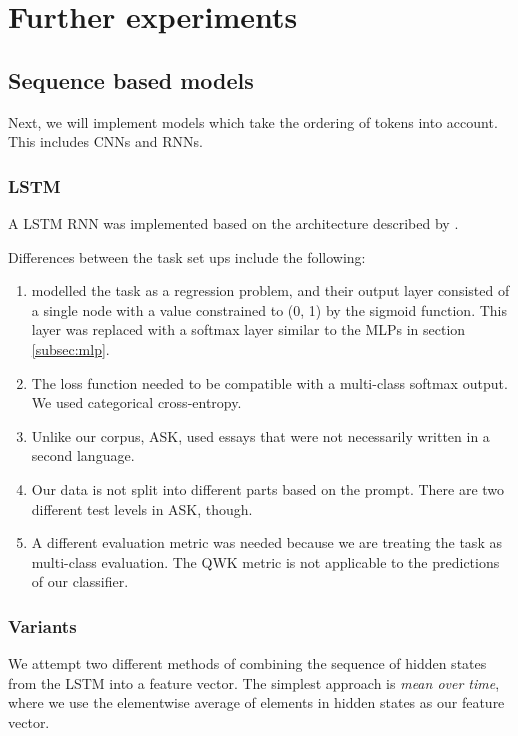 \chapter{Further experiments}

\section{Sequence based models}

Next, we will implement models which take the ordering of tokens into account.
This includes \acp{CNN} and \acp{RNN}. 

\subsection{LSTM}

A \ac{LSTM} \ac{RNN} was implemented based on the architecture described
by \textcite{taghipour16}.

Differences between the task set ups include the following:

\begin{enumerate}
    \item \citeauthor{taghipour16} modelled the task as a regression problem,
        and their output layer consisted of a single node with a value constrained
        to (0, 1) by the sigmoid function. This layer was replaced with a softmax
        layer similar to the \acp{MLP} in section \ref{subsec:mlp}.
    \item The loss function needed to be compatible with a multi-class softmax
        output. We used categorical cross-entropy.
    \item Unlike our corpus, ASK, \citeauthor{taghipour16} used essays that were
        not necessarily written in a second language.
    \item Our data is not split into different parts based on the prompt. There
        are two different test levels in ASK, though.
    \item A different evaluation metric was needed because we are treating the task
        as multi-class evaluation. The \ac{QWK} metric is not applicable to
        the predictions of our classifier.
\end{enumerate}

\subsection{Variants}

We attempt two different methods of combining the sequence of hidden states
from the \ac{LSTM} into a feature vector. The simplest approach is \emph{mean
over time}, where we use the elementwise average of elements in hidden states
as our feature vector.

